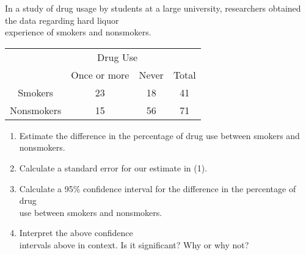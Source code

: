 \documentclass[11pt]{book}\usepackage[]{graphicx}\usepackage[]{color}
\begin{document}
\begin{exercises}
\begin{exercise}  %

In a study of drug usage by students at a large university, researchers obtained the data regarding hard liquor \\ experience of smokers and nonsmokers.

\begin{table}[ht]
\centering
{\small{
\begin{tabular}{@{} cccc @{}} \hline
 & \multicolumn{2}{c}{Drug Use} \\
 & Once or more & Never & Total \\ \hline
Smokers & 23 & 18 & 41 \\
Nonsmokers & 15 & 56 & 71 \\ \hline
\end{tabular}
}}
\end{table}

\begin{enumerate}
\item Estimate the difference in the percentage of drug use between smokers and nonsmokers.
\item Calculate a standard error for our estimate in (1).
\item Calculate a 95\% confidence interval for the difference in the percentage of drug \\ use between smokers and nonsmokers.
\item Interpret the above confidence \\ intervals above in context.
Is it significant? Why or why not?
\end{enumerate}


\end{exercise}
\end{exercises}
\end{document}
